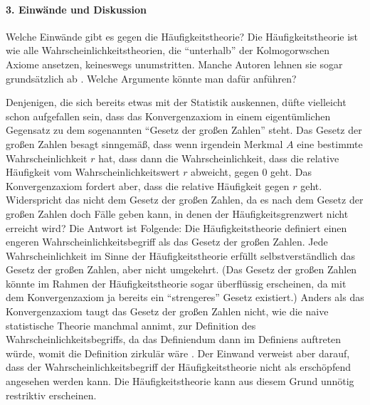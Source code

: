 \paragraph{3. Einwände und Diskussion} Welche Einwände gibt es gegen die
Häufigkeitstheorie? Die Häufigkeitstheorie ist wie alle
Wahrscheinlichkeitstheorien, die "`unterhalb"' der Kolmogorwschen Axiome ansetzen, 
keineswegs unumstritten. Manche Autoren lehnen sie sogar
grundsätzlich ab \cite[]{bosch:1976}. Welche Argumente könnte man dafür
anführen? 

Denjenigen, die sich bereits etwas mit der Statistik auskennen, düfte
vielleicht schon aufgefallen sein, dass das Konvergenzaxiom in einem
eigentümlichen Gegensatz zu dem sogenannten "`Gesetz der großen Zahlen"' steht.
Das Gesetz der großen Zahlen besagt sinngemäß, dass wenn irgendein Merkmal $A$
eine bestimmte Wahrscheinlichkeit $r$ hat, dass dann die Wahrscheinlichkeit,
dass die relative Häufigkeit vom Wahrscheinlichkeitswert $r$ abweicht, gegen 0
geht. Das Konvergenzaxiom fordert aber, dass die relative Häufigkeit gegen $r$
geht. Widerspricht das nicht dem Gesetz der großen Zahlen, da es nach dem Gesetz
der großen Zahlen doch Fälle geben kann, in denen der Häufigkeitsgrenzwert nicht
erreicht wird? Die Antwort ist Folgende: Die Häufigkeitstheorie definiert einen
engeren Wahrscheinlichkeitsbegriff als das Gesetz der großen Zahlen. Jede
Wahrscheinlichkeit im Sinne der Häufigkeitstheorie erfüllt selbstverständlich
das Gesetz der großen Zahlen, aber nicht umgekehrt. (Das Gesetz der großen
Zahlen könnte im Rahmen der Häufigkeitstheorie sogar überflüssig erscheinen, da
mit dem Konvergenzaxiom ja bereits ein "`strengeres"' Gesetz existiert.)
Anders als das Konvergenzaxiom taugt das Gesetz der großen Zahlen nicht, wie
die naive statistische Theorie manchmal annimt, zur Definition des
Wahrscheinlichkeitsbegriffs, da das Definiendum dann im Definiens auftreten
würde, womit die Definition zirkulär wäre \cite[S. 113]{schurz:2006}. Der
Einwand verweist aber darauf, dass der Wahrscheinlichkeitsbegriff der
Häufigkeitstheorie nicht als erschöpfend angesehen werden kann. Die
Häufigkeitstheorie kann aus diesem Grund unnötig restriktiv erscheinen.


